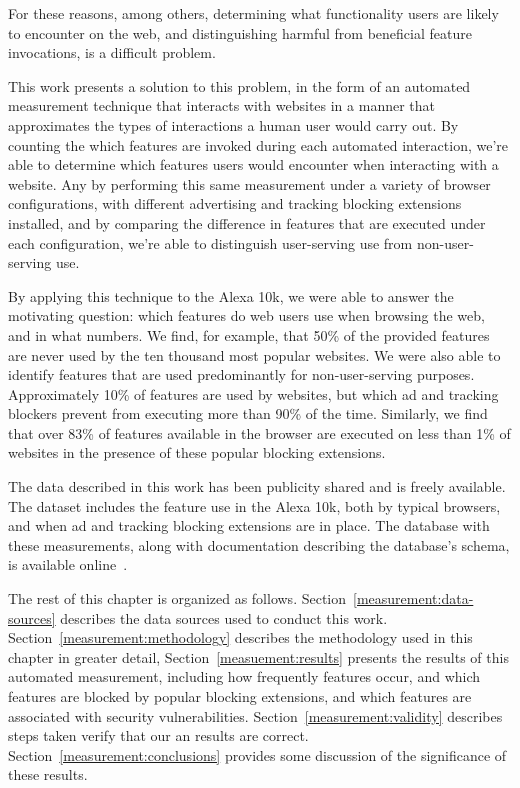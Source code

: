 For these reasons, among others, determining what functionality users are likely
to encounter on the web, and distinguishing harmful from beneficial feature
invocations, is a difficult problem.

This work presents a solution to this problem, in the form of an automated
measurement technique that interacts with websites in a manner that approximates
the types of interactions a human user would carry out.  By counting the
which features are invoked during each automated interaction, we're able
to determine which features users would encounter when interacting with
a website.  Any by performing this same measurement under a variety of
browser configurations, with different advertising and tracking blocking
extensions installed, and by comparing the difference in features that are executed
under each configuration, we're able to distinguish user-serving \WAPI use
from non-user-serving \WAPI use.

By applying this technique to the Alexa 10k, we were able to answer the motivating
question: which \WAPI features do web users use when browsing the web, and in
what numbers.  We find, for example, that 50\% of the \JS provided
features are never used by the ten thousand most popular websites.  We were also
able to identify features that are used predominantly for non-user-serving
purposes.  Approximately 10\% of features are used by websites, but which ad and
tracking blockers prevent from executing more than 90\% of the time.
Similarly, we find that over 83\% of features available in the browser are
executed on less than 1\% of websites in the presence of these popular blocking
extensions.

The data described in this work has been publicity shared and is freely
available.  The dataset includes the \JS feature use in the Alexa 10k,
both by typical browsers, and when ad and tracking blocking extensions are in
place.  The database with these measurements, along
with documentation describing the database's schema, is available
online~\cite{snyderp2016webapidata}.

The rest of this chapter is organized as follows. Section~\ref{measurement:data-sources}
describes the data sources used to conduct this work.
Section~\ref{measurement:methodology} describes the methodology used
in this chapter in greater detail, Section~\ref{measuement:results} presents the
results of this automated measurement, including how frequently features occur,
and which features are blocked by popular blocking extensions, and which
features are associated with security vulnerabilities.  Section~\ref{measurement:validity}
describes steps taken verify that our  an results are correct. Section~\ref{measurement:conclusions}
provides some discussion of the significance of these results.
